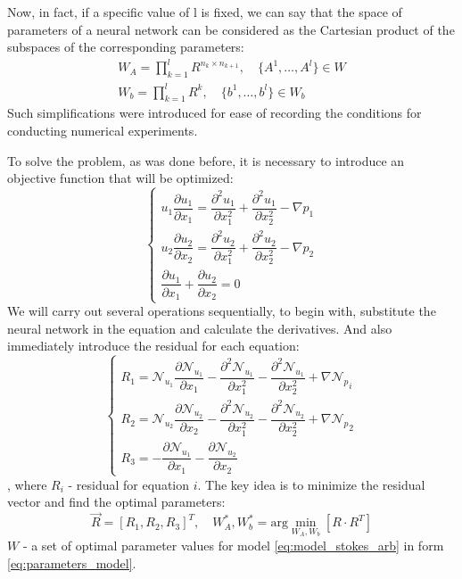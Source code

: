 Now, in fact, if a specific value of l is fixed, we can say that the space of parameters of a neural network can be considered as the Cartesian product of the subspaces of the corresponding parameters:
\begin{equation*}
	\label{eq:parameters_model}
	\begin{multlined}
		W_A = \prod_{k = 1}^{l} R^{n_k \times n_{k + 1}}, \quad \{A^1, \dots, A^l \} \in W \\
		W_b = \prod_{k = 1}^{l} R^{k}, \quad \{b^1, \dots, b^l \} \in W_b
	\end{multlined}
\end{equation*}
Such simplifications were introduced for ease of recording the conditions for conducting numerical experiments.

To solve the problem, as was done before, it is necessary to introduce an objective function that will be optimized:
\begin{equation}
	\begin{cases}
		u_1 \dfrac{\partial u_1}{\partial x_1} = \dfrac{\partial^2 u_1}{\partial x_1^2} + \dfrac{\partial^2 u_1}{\partial x_2^2} - \nabla p_1 \\[10pt]
		u_2 \dfrac{\partial u_2}{\partial x_2} = \dfrac{\partial^2 u_2}{\partial x_1^2} + \dfrac{\partial^2 u_2}{\partial x_2^2} - \nabla p_2 \\[10pt]
		\dfrac{\partial u_1}{\partial x_1} + \dfrac{\partial u_2}{\partial x_2} = 0
	\end{cases}
\end{equation}
We will carry out several operations sequentially, to begin with, substitute the neural network in the equation and calculate the derivatives. And also immediately introduce the residual for each equation:
\begin{equation}
	\begin{cases}
		R_1 = \mathcal{N}_{u_1} \dfrac{\partial \mathcal{N}_{u_1}}{\partial x_1} - \dfrac{\partial^2 \mathcal{N}_{u_1}}{\partial x_1^2} - \dfrac{\partial^2 \mathcal{N}_{u_1}}{\partial x_2^2} + {\nabla \mathcal{N}_{p}}_i \\[10pt]
		R_2 = \mathcal{N}_{u_2} \dfrac{\partial \mathcal{N}_{u_2}}{\partial x_2} - \dfrac{\partial^2 \mathcal{N}_{u_2}}{\partial x_1^2} - \dfrac{\partial^2 \mathcal{N}_{u_2}}{\partial x_2^2} + {\nabla \mathcal{N}_{p}}_2 \\[10pt]
		R_3 = -\dfrac{\partial \mathcal{N}_{u_1}}{\partial x_1} - \dfrac{\partial \mathcal{N}_{u_2}}{\partial x_2}
	\end{cases}
\end{equation}
, where $R_i$ - residual for equation $i$. The key idea is to minimize the residual vector and find the optimal parameters:
\begin{equation}
	\vec{R} = [R_1, R_2, R_3]^T, \quad W_A^*, W_b^* = \text{arg} \min_{W_A, W_b} \left [ R \cdot R^T \right ]
\end{equation}
$W$ - a set of optimal parameter values for model \ref{eq:model_stokes_arb} in form \eqref{eq:parameters_model}.

